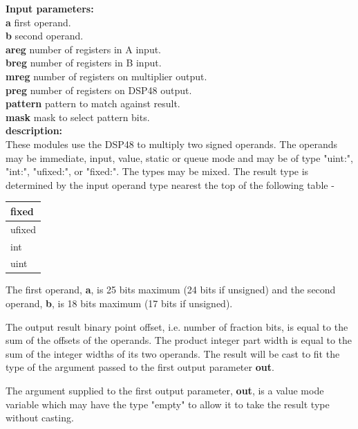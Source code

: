             {\bf Input parameters:} \\
            {\bf a} first operand.\\
            {\bf b} second operand.\\
            {\bf areg} number of registers in A input.\\
            {\bf breg} number of registers in B input.\\
            {\bf mreg} number of registers on multiplier output.\\
            {\bf preg} number of registers on DSP48 output.\\
            {\bf pattern} pattern to match against result.\\
            {\bf mask} mask to select pattern bits.\\

            {\bf description:} \\
            These modules use the DSP48 to multiply two signed operands. The
            operands may be immediate, input, value, static or queue mode and may
            be of type "uint:", "int:", "ufixed:", or "fixed:". The types may be
            mixed. The result type is determined by the input operand type
            nearest the top of the following table -

            \begin{tabular}{| l |}
            \hline
            fixed   \\ \hline
            ufixed  \\ \hline
            int     \\ \hline
            uint    \\ \hline
            \end{tabular}

            The first operand, {\bf a}, is 25 bits maximum (24 bits if unsigned)
            and the second operand, {\bf b}, is 18 bits maximum (17 bits if
            unsigned).

            The output result binary point offset, i.e. number of fraction bits,
            is equal to the sum of the offsets of the operands. The product
            integer part width is equal to the sum of the integer widths of its
            two operands. The result will be cast to fit the type of the
            argument passed to the first output parameter {\bf out}.

            The argument supplied to the first output parameter, {\bf out}, is a
            value mode variable which may have the type "empty" to allow it
            to take the result type without casting.

